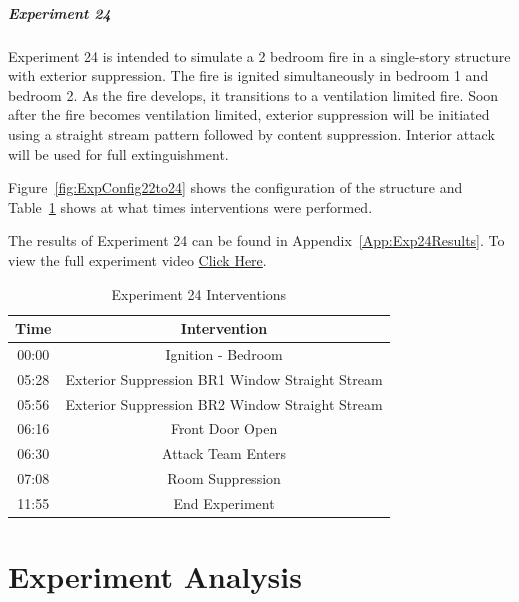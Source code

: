 \documentclass[12pt,oneside]{book}
\begin{document}
\clearpage

\paragraph{Experiment 24} \mbox{}

Experiment 24 is intended to simulate a 2 bedroom fire in a single-story structure with exterior suppression. The fire is ignited simultaneously in bedroom 1 and bedroom 2. As the fire develops, it transitions to a ventilation limited fire. Soon after the fire becomes ventilation limited, exterior suppression will be initiated using a straight stream pattern followed by content suppression. Interior attack will be used for full extinguishment.

Figure~\ref{fig:ExpConfig22to24} shows the configuration of the structure and Table~\ref{Table:Exp24Interventions} shows at what times interventions were performed. 

The results of Experiment 24 can be found in Appendix~\ref{App:Exp24Results}. To view the full experiment video \href{https://youtu.be/gl8rc1Nsl1k}{Click Here}.

\begin{table}[H]
	\centering
	\caption{Experiment 24 Interventions}
	\begin{tabular}{|c|c|} 
		\hline
		Time & Intervention \\ \hline \hline
		00:00 & Ignition - Bedroom \\ \hline
		05:28 & Exterior Suppression BR1 Window Straight Stream \\ \hline
		05:56 & Exterior Suppression BR2 Window Straight Stream \\ \hline		
		06:16 & Front Door Open \\ \hline
		06:30 & Attack Team Enters\\ \hline
		07:08 & Room Suppression \\ \hline 
		11:55 & End Experiment\\ \hline
	\end{tabular}
	\label{Table:Exp24Interventions}
\end{table}

\clearpage

\chapter{Experiment Analysis}
\end{document}
